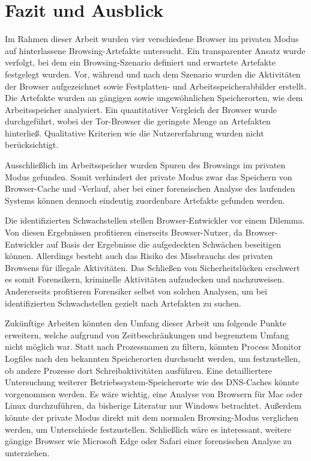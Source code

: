 \chapter{Fazit und Ausblick}\label{chap:Fazit-Ausblick}
\thispagestyle{plain.scrheadings}
\ohead{\headmark}

Im Rahmen dieser Arbeit wurden vier verschiedene Browser im privaten Modus auf hinterlassene Browsing-Artefakte untersucht. Ein transparenter Ansatz wurde verfolgt, bei dem ein Browsing-Szenario definiert und erwartete Artefakte festgelegt wurden. Vor, während und nach dem Szenario wurden die Aktivitäten der Browser aufgezeichnet sowie Festplatten- und Arbeitsspeicherabbilder erstellt. Die Artefakte wurden an gängigen sowie ungewöhnlichen Speicherorten, wie dem Arbeitsspeicher analysiert. Ein quantitativer Vergleich der Browser wurde durchgeführt, wobei der Tor-Browser die geringste Menge an Artefakten hinterließ. Qualitative Kriterien wie die Nutzererfahrung wurden nicht berücksichtigt.

Ausschließlich im Arbeitsspeicher wurden Spuren des Browsings im privaten Modus gefunden. Somit verhindert der private Modus zwar das Speichern von Browser-Cache und -Verlauf, aber bei einer forensischen Analyse des laufenden Systems können dennoch eindeutig zuordenbare Artefakte gefunden werden.

Die identifizierten Schwachstellen stellen Browser-Entwickler vor einem Dilemma.
Von diesen Ergebnissen profitieren einerseits Browser-Nutzer, da Browser-Entwickler auf Basis der Ergebnisse die aufgedeckten Schwächen beseitigen können.
Allerdings besteht auch das Risiko des Missbrauchs des privaten Browsens für illegale Aktivitäten.
Das Schließen von Sicherheitslücken erschwert es somit Forensikern, kriminelle Aktivitäten aufzudecken und nachzuweisen. 
Andererseits profitieren Forensiker selbst von solchen Analysen, um bei identifizierten Schwachstellen gezielt nach Artefakten zu suchen. 

Zukünftige Arbeiten könnten den Umfang dieser Arbeit um folgende Punkte erweitern, welche aufgrund von Zeitbeschränkungen und begrenztem Umfang nicht möglich war. Statt nach Prozessnamen zu filtern, könnten Process Monitor Logfiles nach den bekannten Speicherorten durchsucht werden, um festzustellen, ob andere Prozesse dort Schreibaktivitäten ausführen. Eine detailliertere Untersuchung weiterer Betriebssystem-Speicherorte wie des DNS-Caches könnte vorgenommen werden. Es wäre wichtig, eine Analyse von Browsern für Mac oder Linux durchzuführen, da bisherige Literatur nur Windows betrachtet. Außerdem könnte der private Modus direkt mit dem normalen Browsing-Modus verglichen werden, um Unterschiede festzustellen. Schließlich wäre es interessant, weitere gängige Browser wie Microsoft Edge oder Safari einer forensischen Analyse zu unterziehen.

